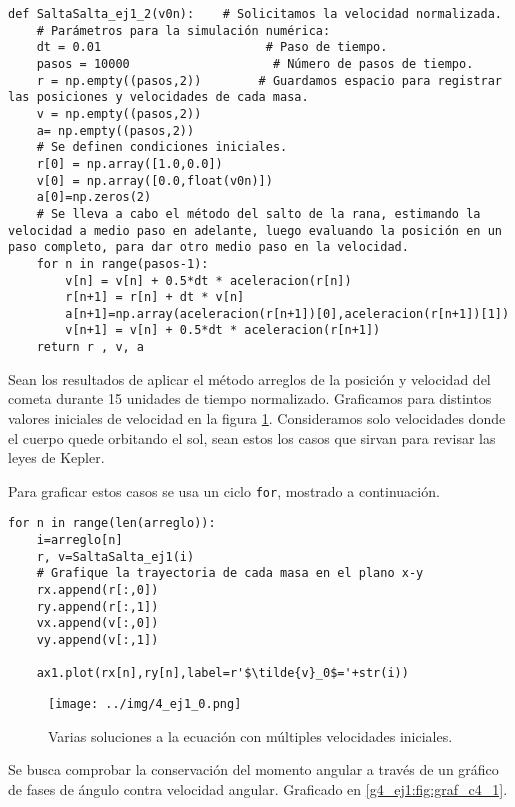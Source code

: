 \documentclass[../portafolio.tex]{subfiles}
\begin{document}
\begin{verbatim}
def SaltaSalta_ej1_2(v0n):    # Solicitamos la velocidad normalizada.
    # Parámetros para la simulación numérica:
    dt = 0.01                       # Paso de tiempo.
    pasos = 10000                    # Número de pasos de tiempo.
    r = np.empty((pasos,2))        # Guardamos espacio para registrar las posiciones y velocidades de cada masa.
    v = np.empty((pasos,2))
    a= np.empty((pasos,2))
    # Se definen condiciones iniciales.
    r[0] = np.array([1.0,0.0])
    v[0] = np.array([0.0,float(v0n)])
    a[0]=np.zeros(2)
    # Se lleva a cabo el método del salto de la rana, estimando la velocidad a medio paso en adelante, luego evaluando la posición en un paso completo, para dar otro medio paso en la velocidad.
    for n in range(pasos-1):
        v[n] = v[n] + 0.5*dt * aceleracion(r[n])
        r[n+1] = r[n] + dt * v[n]
        a[n+1]=np.array(aceleracion(r[n+1])[0],aceleracion(r[n+1])[1])
        v[n+1] = v[n] + 0.5*dt * aceleracion(r[n+1])
    return r , v, a
\end{verbatim}

Sean los resultados de aplicar el método arreglos de la posición y velocidad del cometa durante 15 unidades de tiempo normalizado. Graficamos para distintos valores iniciales de velocidad en la figura \ref{g4_ej1:fig:graf_c4_0}. Consideramos solo velocidades donde el cuerpo quede orbitando el sol, sean estos los casos que sirvan para revisar las leyes de Kepler.

Para graficar estos casos se usa un ciclo \texttt{for}, mostrado a continuación.
\begin{verbatim}
for n in range(len(arreglo)):
    i=arreglo[n]
    r, v=SaltaSalta_ej1(i)
    # Grafique la trayectoria de cada masa en el plano x-y
    rx.append(r[:,0])
    ry.append(r[:,1])
    vx.append(v[:,0])
    vy.append(v[:,1])

    ax1.plot(rx[n],ry[n],label=r'$\tilde{v}_0$='+str(i))
\end{verbatim}

\begin{figure}
\centering
\texttt{[image: ../img/4\_ej1\_0.png]}
\caption{Varias soluciones a la ecuación con múltiples velocidades iniciales.} \label{g4_ej1:fig:graf_c4_0}
\end{figure}


Se busca comprobar la conservación del momento angular a través de un gráfico de fases de ángulo contra velocidad angular. Graficado en \ref{g4_ej1:fig:graf_c4_1}.
\end{document}
